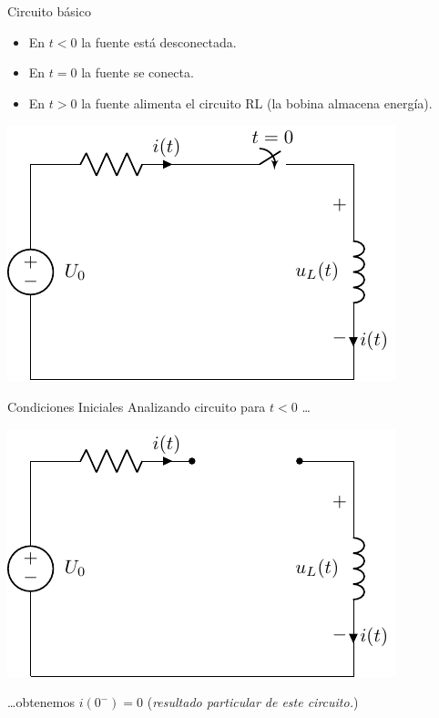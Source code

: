 \documentclass[aspectratio=169, usenames,svgnames,dvipsnames]{beamer}
\begin{document}
\begin{frame}[label={sec:orga1783ab}]{Circuito básico}
\begin{itemize}
\item En \(t < 0\) la fuente está desconectada.
\item En \(t = 0\) la fuente se conecta.
\item En \(t > 0\) la fuente alimenta el circuito RL (la bobina almacena energía).
\end{itemize}

\begin{center}
\includegraphics[height=0.55\textheight]{../figs/transitorio_circuitoRL.pdf}
\end{center}
\end{frame}

\begin{frame}[label={sec:orga1a3ec3}]{Condiciones Iniciales}
Analizando circuito para \(t < 0\) \ldots{}
\begin{center}
\includegraphics[height=0.45\textheight]{../figs/transitorio_circuitoRL_t0-.pdf}
\end{center}
\ldots{}obtenemos  \(i(0^-) = 0\) (\emph{resultado particular de este circuito.})
\end{frame}
\end{document}
